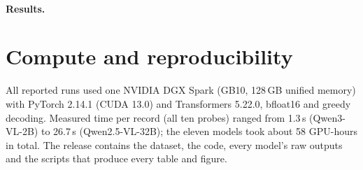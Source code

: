 \documentclass[10pt,twocolumn,letterpaper]{article}
\begin{document}
\paragraph{Results.} 

\section{Compute and reproducibility}
\label{sec:s-compute}
All reported runs used one NVIDIA DGX Spark (GB10, 128\,GB unified memory) with PyTorch 2.14.1 (CUDA 13.0) and Transformers 5.22.0, bfloat16 and greedy decoding. Measured time per record (all ten probes) ranged from 1.3\,s (Qwen3-VL-2B) to 26.7\,s (Qwen2.5-VL-32B); the eleven models took about 58 GPU-hours in total. The release contains the dataset, the code, every model's raw outputs and the scripts that produce every table and figure.
\end{document}
